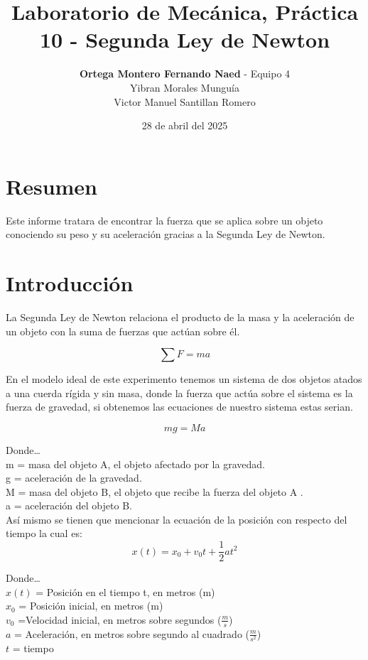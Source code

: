 \documentclass[12pt,a4paper]{article}
\begin{document}
\title{Laboratorio de Mecánica, Práctica 10 - Segunda Ley de Newton}
\date{28 de abril del 2025}
\author{\textbf{Ortega Montero Fernando Naed} - Equipo 4\\
Yibran Morales Munguía\\
Victor Manuel Santillan Romero}
\maketitle
\section{Resumen}

Este informe tratara de encontrar la fuerza que se aplica sobre un objeto conociendo su peso y su aceleración gracias a la Segunda Ley de Newton. 

\section{Introducción}

La Segunda Ley de Newton relaciona el producto de la masa y la aceleración de un objeto con la suma de fuerzas que actúan sobre él.

\[\sum F = m a\]

En el modelo ideal de este experimento tenemos un sistema de dos objetos atados a una cuerda rígida y sin masa, donde la fuerza que actúa sobre el sistema es la fuerza de gravedad, si obtenemos las ecuaciones de nuestro sistema estas serian.

\[mg = Ma\]

Donde…\\
m = masa del objeto A, el objeto afectado por la gravedad.\\
g = aceleración de la gravedad.\\
M = masa del objeto B, el objeto que recibe la fuerza del objeto A .\\
a = aceleración del objeto B.\\

Así mismo se tienen que mencionar la ecuación de la posición con respecto del tiempo la cual es: 
\[ x(t) = x_0 + v_0 t + \frac{1}{2}a t^2\]

Donde…\\
$x(t)$ = Posición en el tiempo t, en metros (m)\\
$x_0$ = Posición inicial, en metros (m)\\
$v_0$ =Velocidad inicial, en metros sobre segundos ($\frac{m}{s}$)\\
$a$ = Aceleración, en metros sobre segundo al cuadrado ($\frac{m}{s^2}$)\\
$t$ = tiempo
\end{document}
